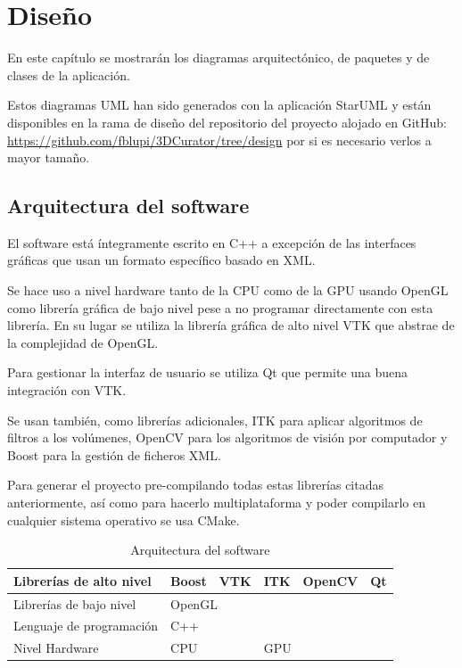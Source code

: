 \chapter{Diseño}

En este capítulo se mostrarán los diagramas arquitectónico, de paquetes y de clases de la aplicación. 

Estos diagramas UML han sido generados con la aplicación StarUML \cite{staruml} y están disponibles en la rama de diseño del repositorio del proyecto alojado en GitHub: \url{https://github.com/fblupi/3DCurator/tree/design} por si es necesario verlos a mayor tamaño.

\section{Arquitectura del software}

El software está íntegramente escrito en C++ a excepción de las interfaces gráficas que usan un formato específico basado en XML.

Se hace uso a nivel hardware tanto de la CPU como de la GPU usando OpenGL como librería gráfica de bajo nivel pese a no programar directamente con esta librería. En su lugar se utiliza la librería gráfica de alto nivel VTK que abstrae de la complejidad de OpenGL.

Para gestionar la interfaz de usuario se utiliza Qt que permite una buena integración con VTK.

Se usan también, como librerías adicionales, ITK para aplicar algoritmos de filtros a los volúmenes, OpenCV para los algoritmos de visión por computador y Boost para la gestión de ficheros XML.

Para generar el proyecto pre-compilando todas estas librerías citadas anteriormente, así como para hacerlo multiplataforma y poder compilarlo en cualquier sistema operativo se usa CMake.

\begin{table}[H]
	\begin{center}
		\begin{tabular}{|l|c|c|c|c|c|}
			\hline
			Librerías de alto nivel  & Boost        & VTK       & ITK    & OpenCV   & Qt   \\ \hline
			Librerías de bajo nivel  & \multicolumn{5}{l|}{OpenGL}                         \\ \hline
			Lenguaje de programación & \multicolumn{5}{l|}{C++}                            \\ \hline
			Nivel Hardware           & \multicolumn{2}{l|}{CPU} & \multicolumn{3}{l|}{GPU} \\ \hline
		\end{tabular}
	\end{center}
	\caption{Arquitectura del software}
	\label{tab:diseno/diagrama-arquitectonico}
\end{table}

